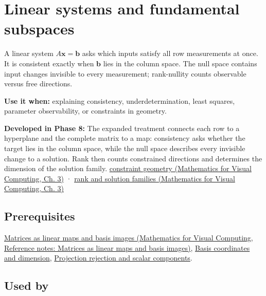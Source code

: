 \hypertarget{appendix-8572a4a060c1}{}\label{referencestart:appendix-8572a4a060c1}
\section{Linear systems and fundamental subspaces}\label{appendix-8572a4a060c1-linear-systems-and-fundamental-subspaces}

\hypertarget{appendix-8572a4a060c1-linear-systems-and-fundamental-subspaces}{}

A linear system \(A\mathbf x=\mathbf b\) asks which inputs satisfy all row measurements at once. It is consistent exactly when \(\mathbf b\) lies in the column space. The null space contains input changes invisible to every measurement; rank-nullity counts observable versus free directions.

\textbf{Use it when:} explaining consistency, underdetermination, least squares, parameter observability, or constraints in geometry.

\textbf{Developed in Phase 8:} The expanded treatment connects each row to a hyperplane and the complete matrix to a map: consistency asks whether the target lies in the column space, while the null space describes every invisible change to a solution. Rank then counts constrained directions and determines the dimension of the solution family. \href{../02-Mathematics-for-Visual-Computing/main.pdf\#nameddest=01-foundations-i-ch019-a-system-is-an-intersection-of-constraints}{constraint geometry (Mathematics for Visual Computing, Ch. 3)} · \href{../02-Mathematics-for-Visual-Computing/main.pdf\#nameddest=01-foundations-i-ch019-rank-the-four-spaces-and-the-shape-of-the-answer}{rank and solution families (Mathematics for Visual Computing, Ch. 3)}

\subsection{Prerequisites}\label{appendix-8572a4a060c1-prerequisites}

\hypertarget{appendix-8572a4a060c1-prerequisites}{}

\href{../02-Mathematics-for-Visual-Computing/main.pdf\#nameddest=appendix-bd39c3bf5d64}{Matrices as linear maps and basis images (Mathematics for Visual Computing, Reference notes: Matrices as linear maps and basis images)}, \hyperref[appendix-ce0341f7ea0d]{Basis coordinates and dimension}, \hyperref[appendix-505a502c372a]{Projection rejection and scalar components}.

\subsection{Used by}\label{appendix-8572a4a060c1-used-by}

